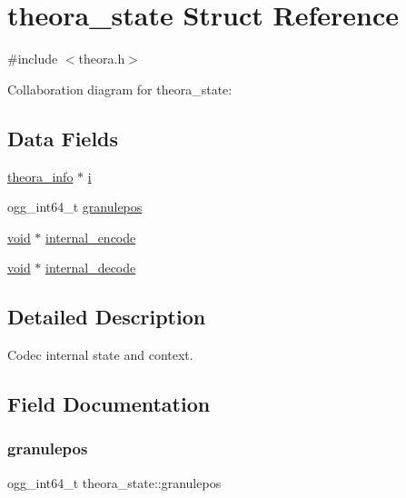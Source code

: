 \hypertarget{structtheora__state}{}\section{theora\+\_\+state Struct Reference}
\label{structtheora__state}


{\ttfamily \#include $<$theora.\+h$>$}



Collaboration diagram for theora\+\_\+state\+:
\subsection*{Data Fields}
\begin{DoxyCompactItemize}
\item 
\hyperlink{structtheora__info}{theora\+\_\+info} $\ast$ \hyperlink{structtheora__state_a0efc7ac581ef260b0ca17f518ace0731}{i}
\item 
ogg\+\_\+int64\+\_\+t \hyperlink{structtheora__state_a5dd344a3f79ea7501b18c756772fab7b}{granulepos}
\item 
\hyperlink{png_8h_ac9c84fa68bbad002983e35ce3663c686}{void} $\ast$ \hyperlink{structtheora__state_a1fbfd82fb7210cbcc4233cb680ec2af6}{internal\+\_\+encode}
\item 
\hyperlink{png_8h_ac9c84fa68bbad002983e35ce3663c686}{void} $\ast$ \hyperlink{structtheora__state_ad20c4eebbc5ed9764cf03ba8b90e796e}{internal\+\_\+decode}
\end{DoxyCompactItemize}


\subsection{Detailed Description}
Codec internal state and context. 

\subsection{Field Documentation}
\mbox{\label{structtheora__state_a5dd344a3f79ea7501b18c756772fab7b}} 
\subsubsection{\texorpdfstring{granulepos}{granulepos}}
{\footnotesize\ttfamily ogg\+\_\+int64\+\_\+t theora\+\_\+state\+::granulepos}

